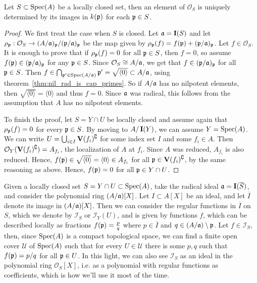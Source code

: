 \begin{lemma}\label{lem:O_Y_unique}
  Let $S \subset \operatorname{Spec}(A)$ be a locally closed set, then an element of $\mathcal O_{S}$ is uniquely determined by its images in $k(\mathfrak p)$ for each $\mathfrak p \in S$.
\end{lemma}
\begin{proof}
  We first treat the case when $S$ is closed. Let $\mathfrak{a} = \operatorname{\mathbf I}(S)$ and let $\rho_{\mathfrak p} : \mathcal O_{S} \to (A/\mathfrak{a})_{\mathfrak p}/(\mathfrak p/\mathfrak{a})_{\mathfrak p}$ be the map given by $\rho_{\mathfrak p}(f) = f(\mathfrak p) + (\mathfrak p/\mathfrak{a})_{\mathfrak p}$. Let $f \in \mathcal O_{S}$. It is enough to prove that if $\rho_{\mathfrak p}(f) = 0$ for all $\mathfrak p \in S$, then $f = 0$, so assume $f(\mathfrak p) \in (\mathfrak p/\mathfrak{a})_{\mathfrak p}$ for any $\mathfrak p \in S$. Since $\mathcal O_{S} \cong A/\mathfrak{a}$, we get that $f \in (\mathfrak p/\mathfrak{a})_{\mathfrak p}$ for all $\mathfrak p \in S$. Then $f \in \bigcap_{\mathfrak p' \in \operatorname{Spec}(A/\mathfrak{a})} \mathfrak p' = \sqrt{\langle 0 \rangle} \subset A/\mathfrak{a}$, using theorem~\ref{thm:nil_rad_is_cap_primes}. So if $A/\mathfrak{a}$ has no nilpotent elements, then $\sqrt{\langle 0 \rangle} = \langle 0 \rangle$ and thus $f = 0$. Since $\mathfrak{a}$ was radical, this follows from the assumption that $A$ has no nilpotent elements.

  To finish the proof, let $S = Y \cap U$ be locally closed and assume again that $\rho_{\mathfrak p}(f) = 0$ for every $\mathfrak p \in S$. By moving to $A/\operatorname{\mathbf I}(Y)$, we can assume $Y = \operatorname{Spec}(A)$. We can write $U = \bigcup_{i \in I} \operatorname{\mathbf V}(f_{i})^{\complement}$ for some index set $I$ and some $f_{i} \in A$. Then $\mathcal O_{Y}(\operatorname{\mathbf V}(f_{i})^{\complement}) = A_{f_{i}}$, the localization of $A$ at $f_{i}$. Since $A$ was reduced, $A_{f_{i}}$ is also reduced. Hence, $f(\mathfrak p) \in \sqrt{\langle 0 \rangle} = \langle 0 \rangle \in A_{f_{i}}$ for all $\mathfrak p \in \operatorname{\mathbf V}(f_{i})^{\complement}$, by the same reasoning as above. Hence, $f(\mathfrak p) = 0$ for all $\mathfrak p \in Y \cap U$.
\end{proof}

Given a locally closed set $S = Y \cap U \subset \operatorname{Spec}(A)$, take the radical ideal $\mathfrak{a} = \operatorname{\mathbf I}(\overline S)$, and consider the polynomial ring $(A/\mathfrak{a})[X]$. Let $I \subset A[X]$ be an ideal, and let $\overline I$ denote its image in $(A/\mathfrak{a})[X]$. Then we can consider the regular functions in $\overline I$ on $S$, which we denote by $\mathcal I_{S}$ or $\mathcal I_{Y}(U)$, and is given by functions $f$, which can be described locally as fractions $f(\mathfrak p) = \frac p q$ where $p \in \overline I$ and $q \in (A/\mathfrak{a}) \setminus \mathfrak p$. Let $f \in \mathcal I_{S}$, then, since $\operatorname{Spec}(A)$ is a compact topological space, we can find a finite open cover $\mathcal U$ of $\operatorname{Spec}(A)$ such that for every $U \in \mathcal U$ there is some $p, q$ such that $f(\mathfrak p) = p/q$ for all $\mathfrak p \in U$. In this light, we can also see $\mathcal I_{S}$ as an ideal in the polynomial ring $\mathcal O_{S}[X]$, i.e. as a polynomial with regular functions as coefficients, which is how we'll use it most of the time.

